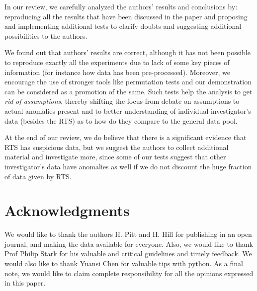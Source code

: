 \documentclass{article}
\begin{document}
In our review, we carefully analyzed the authors' results
and conclusions by: reproducing all the results that have been
discussed in the paper and proposing and implementing additional tests to
clarify doubts and suggesting additional possibilities to the authors.

We found out that authors' results are correct, although it has not been
possible to reproduce exactly all the experiments due to lack of some
key pieces of information (for instance how data has been
pre-processed). Moreover, we encourage the use of stronger tools like permutation tests and our demonstration can be considered as a promotion of the same. Such tests help the analysis to get \textit{rid of assumptions}, thereby shifting the focus from debate on assumptions to actual anomalies present and to better understanding of individual
investigator's data (besides the RTS) as to how do they compare to the general data pool.

At the end of our review, we do believe that there is a significant evidence that RTS has suspicious data, but we suggest the authors to collect additional material and investigate more, since some of our tests suggest that other investigator's
data have anomalies as well if we do not discount the huge fraction of data given by RTS.

\section*{Acknowledgments} %
\label{sec:acknowledgments}

We would like to thank the authors H. Pitt and H. Hill for publishing in an open journal, and making the data available for everyone. Also, we would like to thank Prof Philip Stark for his valuable and critical guidelines and timely feedback. We would also like to thank Yuansi Chen for valuable tips with python. As a final note, we would like to claim complete responsibility for all the opinions expressed in this paper.





    
\end{document}
